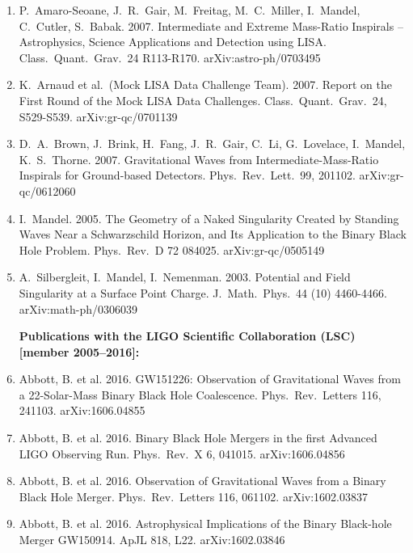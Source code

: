 \documentclass[margin,line]{res}
\begin{document}
\begin{resume}
\begin{enumerate}
\item  P.~Amaro-Seoane, J.~R.~Gair, M.~Freitag, M.~C.~Miller, I.~Mandel,
C.~Cutler, S.~Babak. 2007.  Intermediate and Extreme Mass-Ratio  
Inspirals -- Astrophysics, Science Applications and Detection using
LISA.  Class.~Quant.~Grav.~24 R113-R170. arXiv:astro-ph/0703495

\item  K.~Arnaud et al.~(Mock LISA Data Challenge Team).  2007. Report on the 
First Round of the Mock LISA Data Challenges.  Class.~Quant.~Grav.~24, 
S529-S539. arXiv:gr-qc/0701139

\item  D.~A.~Brown, J.~Brink, H.~Fang, J.~R.~Gair, C.~Li, G.~Lovelace, 
I.~Mandel, K.~S.~Thorne. 2007.  Gravitational Waves from 
Intermediate-Mass-Ratio Inspirals for Ground-based Detectors. Phys.~Rev.~Lett.~99, 201102. arXiv:gr-qc/0612060

\item  I.~Mandel. 2005. The Geometry of a Naked Singularity Created by Standing 
Waves Near a Schwarzschild Horizon, and Its Application to the Binary 
Black Hole Problem. Phys.~Rev.~D 72 084025.  arXiv:gr-qc/0505149

\item  A.~Silbergleit, I.~Mandel, I.~Nemenman.  2003.  Potential and Field 
Singularity at a Surface Point Charge.  J.~Math.~Phys.~44 (10) 
4460-4466.  arXiv:math-ph/0306039

\vspace{0.2in}
{\bf \large Publications with the LIGO Scientific Collaboration (LSC) [member 2005--2016]:}


\item Abbott, B. et al. 2016.  GW151226: Observation of Gravitational Waves from a 22-Solar-Mass Binary Black Hole Coalescence.  Phys.~Rev.~Letters 116, 241103.  	arXiv:1606.04855

\item Abbott, B. et al. 2016.  Binary Black Hole Mergers in the first Advanced LIGO Observing Run.  Phys.~Rev.~X 6, 041015.  	arXiv:1606.04856

\item Abbott, B. et al. 2016.  Observation of Gravitational Waves from a Binary Black Hole Merger.  Phys.~Rev.~Letters 116, 061102.  arXiv:1602.03837

\item Abbott, B. et al. 2016.  Astrophysical Implications of the Binary Black-hole Merger GW150914.  ApJL 818, L22. arXiv:1602.03846


\end{enumerate}
\end{resume}
\end{document}
